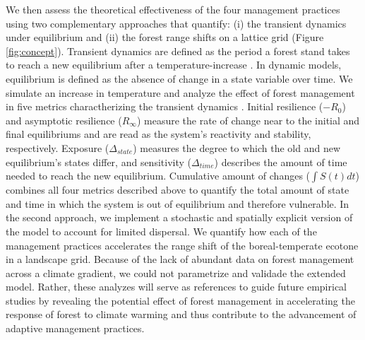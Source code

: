 We then assess the theoretical effectiveness of the four management
practices using two complementary approaches that quantify: (i) the
transient dynamics under equilibrium and (ii) the forest range shifts on
a lattice grid (Figure \ref{fig:concept}). Transient dynamics are
defined as the period a forest stand takes to reach a new equilibrium
after a temperature-increase \citep{Hastings2004}. In dynamic models,
equilibrium is defined as the absence of change in a state variable over
time. We simulate an increase in temperature and analyze the effect of
forest management in five metrics charactherizing the transient dynamics
\citep{Boulangeat2018}. Initial resilience (\(-R_0\)) and asymptotic
resilience (\(R_{\infty}\)) measure the rate of change near to the
initial and final equilibriums and are read as the system's reactivity
and stability, respectively. Exposure (\(\Delta_{state}\)) measures the
degree to which the old and new equilibrium's states differ, and
sensitivity (\(\Delta_{time}\)) describes the amount of time needed to
reach the new equilibrium. Cumulative amount of changes
(\(\int S(t)dt\)) combines all four metrics described above to quantify
the total amount of state and time in which the system is out of
equilibrium and therefore vulnerable. In the second approach, we
implement a stochastic and spatially explicit version of the model to
account for limited dispersal. We quantify how each of the management
practices accelerates the range shift of the boreal-temperate ecotone in
a landscape grid. Because of the lack of abundant data on forest
management across a climate gradient, we could not parametrize and
validade the extended model. Rather, these analyzes will serve as
references to guide future empirical studies by revealing the potential
effect of forest management in accelerating the response of forest to
climate warming and thus contribute to the advancement of adaptive
management practices.\\

